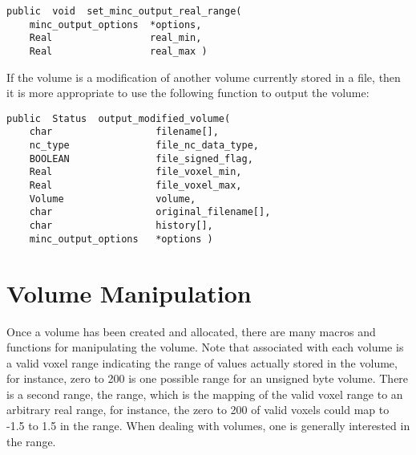 
{\bf\begin{verbatim}
public  void  set_minc_output_real_range(
    minc_output_options  *options,
    Real                 real_min,
    Real                 real_max )
\end{verbatim}}


If the volume is a modification of another volume currently stored in
a file, then it is more appropriate to use the following function to
output the volume:

{\bf\begin{verbatim}
public  Status  output_modified_volume(
    char                  filename[],
    nc_type               file_nc_data_type,
    BOOLEAN               file_signed_flag,
    Real                  file_voxel_min,
    Real                  file_voxel_max,
    Volume                volume,
    char                  original_filename[],
    char                  history[],
    minc_output_options   *options )
\end{verbatim}}


\section{Volume Manipulation}

Once a volume has been created and allocated, there are many macros
and functions for manipulating the volume.  Note that associated with
each volume is a valid voxel range indicating the range of values
actually stored in the volume, for instance, zero to 200 is one
possible range for an unsigned byte volume.  There is a second range,
the  range, which is the mapping of the valid voxel range
to an arbitrary real range, for instance, the zero to 200 of valid
voxels could map to -1.5 to 1.5 in the  range.  When
dealing with volumes, one is generally interested in the 
range.


